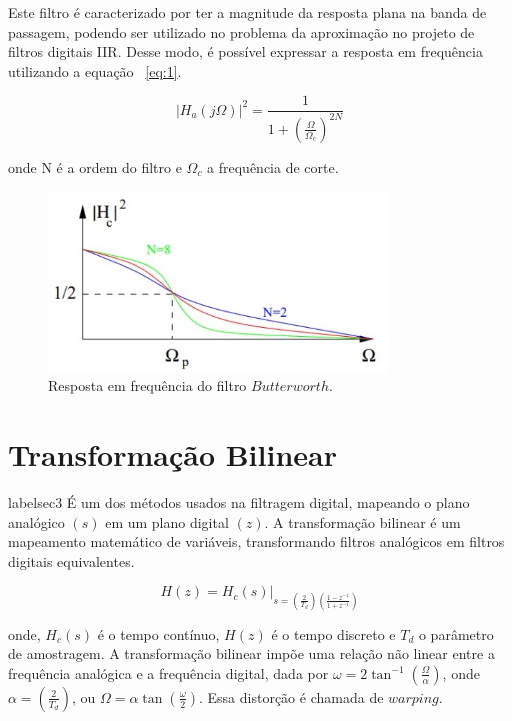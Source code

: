 \documentclass[12pt]{article}
\begin{document}
 Este filtro \'e caracterizado por ter a magnitude da resposta plana na banda de  passagem, podendo ser utilizado no problema da aproxima\c c\~ao no projeto de filtros digitais IIR. Desse modo, \'e poss\'ivel expressar a resposta em frequ\^encia utilizando a equa\c c\~ao ~\ref{eq:1}.

\begin{equation} \label{eq:1}
|H_a(j\Omega)|^2 = \frac{1}{1+(\frac{\Omega}{\Omega_c})^{2N}}
\end{equation}

onde N \'e a ordem do filtro e  $\Omega_{c}$ a frequ\^encia de corte.

\begin{figure}[H]
\centering
\includegraphics[width=9cm]{butter}
\caption{Resposta em frequ\^encia do filtro $Butterworth$.}
\label{butterw}
\end{figure}

\section{Transforma\c c\~ao Bilinear}
label{sec3}
\'E um dos m\'etodos usados na filtragem digital, mapeando o plano anal\'ogico $(s)$ em um plano digital $(z)$. A transforma\c c\~ao bilinear é um mapeamento matem\'atico de vari\'aveis, transformando filtros anal\'ogicos em filtros digitais equivalentes.

\begin{equation} \label{eq:2}
H(z) = H_c(s)|_{s=(\frac{2}{T_d})(\frac{1-z^{-1}}{1+z^{-1}})}
\end{equation}

onde, $H_c(s)$ é o tempo contínuo, $H(z)$ é o tempo discreto e $T_d$ o par\^ametro de amostragem. A transforma\c c\~ao bilinear imp\~oe uma rela\c c\~ao n\~ao linear entre a frequ\^encia anal\'ogica e a frequ\^encia digital, dada por $\omega = 2\tan^{-1}(\frac{\Omega}{\alpha})$, onde $\alpha= (\frac{2}{T_d})$, ou $\Omega = \alpha\tan(\frac{\omega}{2})$. Essa distor\c c\~ao \' e chamada de $warping$.
\end{document}
